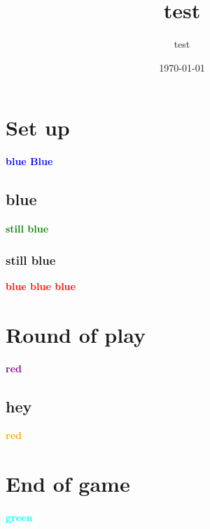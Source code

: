 \documentclass{article}%
\title{test}%
\author{test}%
\date{\today}%
\begin{document}
%
\normalsize%
\maketitle\thispagestyle{header}%
\pagestyle{header}%
\section{ Set up
}%
\label{sec:Setup}%
\textcolor{blue}{%
\textbf{blue Blue}%
}%



%
\subsection{ blue
}%
\label{subsec:blue}%
\textcolor{green}{%
\textbf{ still blue}%
}%



%
\subsubsection{ still blue
}%
\label{ssubsec:stillblue}%
\textcolor{red}{%
\textbf{ blue blue blue}%
}%



%
\section{ Round of play
}%
\label{sec:Roundofplay}%
\textcolor{purple}{%
\textbf{red}%
}%



%
\subsection{ hey
}%
\label{subsec:hey}%
\textcolor{orange}{%
\textbf{red}%
}%



%
\section{ End of game
}%
\label{sec:Endofgame}%
\textcolor{cyan}{%
\textbf{green}%
}

%
\end{document}

